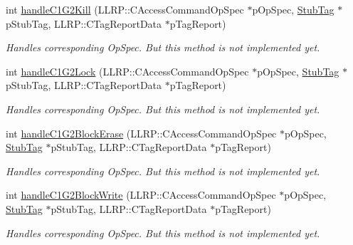 \begin{DoxyCompactItemize}
\item 
int \hyperlink{class_e_l_f_i_n_1_1_access_operation_aaa62c42a3e98fdb8a583a16561c4d416}{handle\-C1\-G2\-Kill} (L\-L\-R\-P\-::\-C\-Access\-Command\-Op\-Spec $\ast$p\-Op\-Spec, \hyperlink{class_e_l_f_i_n_1_1_stub_tag}{Stub\-Tag} $\ast$p\-Stub\-Tag, L\-L\-R\-P\-::\-C\-Tag\-Report\-Data $\ast$p\-Tag\-Report)
\begin{DoxyCompactList}\small\item\em Handles corresponding Op\-Spec. But this method is not implemented yet. \end{DoxyCompactList}\item 
int \hyperlink{class_e_l_f_i_n_1_1_access_operation_a0fccaea52a98abc72788c6fe7b5bbe2d}{handle\-C1\-G2\-Lock} (L\-L\-R\-P\-::\-C\-Access\-Command\-Op\-Spec $\ast$p\-Op\-Spec, \hyperlink{class_e_l_f_i_n_1_1_stub_tag}{Stub\-Tag} $\ast$p\-Stub\-Tag, L\-L\-R\-P\-::\-C\-Tag\-Report\-Data $\ast$p\-Tag\-Report)
\begin{DoxyCompactList}\small\item\em Handles corresponding Op\-Spec. But this method is not implemented yet. \end{DoxyCompactList}\item 
int \hyperlink{class_e_l_f_i_n_1_1_access_operation_aa7a89cb757c2d02c222a5a68703c3fd7}{handle\-C1\-G2\-Block\-Erase} (L\-L\-R\-P\-::\-C\-Access\-Command\-Op\-Spec $\ast$p\-Op\-Spec, \hyperlink{class_e_l_f_i_n_1_1_stub_tag}{Stub\-Tag} $\ast$p\-Stub\-Tag, L\-L\-R\-P\-::\-C\-Tag\-Report\-Data $\ast$p\-Tag\-Report)
\begin{DoxyCompactList}\small\item\em Handles corresponding Op\-Spec. But this method is not implemented yet. \end{DoxyCompactList}\item 
int \hyperlink{class_e_l_f_i_n_1_1_access_operation_a33d4d046de073308c854a5e16595197f}{handle\-C1\-G2\-Block\-Write} (L\-L\-R\-P\-::\-C\-Access\-Command\-Op\-Spec $\ast$p\-Op\-Spec, \hyperlink{class_e_l_f_i_n_1_1_stub_tag}{Stub\-Tag} $\ast$p\-Stub\-Tag, L\-L\-R\-P\-::\-C\-Tag\-Report\-Data $\ast$p\-Tag\-Report)
\begin{DoxyCompactList}\small\item\em Handles corresponding Op\-Spec. But this method is not implemented yet. \end{DoxyCompactList}\end{DoxyCompactItemize}

